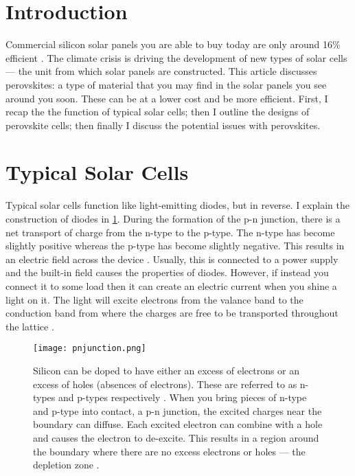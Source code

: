 \documentclass{physics_article_B}
\date{\today}
\begin{document}
\maketitle

\section*{Introduction}
Commercial silicon solar panels you are able to buy today are only around 16\% efficient \cite{extance_reality_2019}. The climate crisis is driving the development of new types of solar cells --- the unit from which solar panels are constructed. This article discusses perovskites: a type of material that you may find in the solar panels you see around you soon. These can be at a lower cost and be more efficient. First, I recap the the function of typical solar cells; then I outline the designs of perovskite cells; then finally I discuss the potential issues with perovskites.

\section*{Typical Solar Cells}

Typical solar cells function like light-emitting diodes, but in reverse. I explain the construction of diodes in \cref{fig:pnjunction}. During the formation of the p-n junction, there is a net transport of charge from the n-type to the p-type. The n-type has become slightly positive whereas the p-type has become slightly negative. This results in an electric field across the device \cite{zhang_device_2017}. Usually, this is connected to a power supply and the built-in field causes the properties of diodes. However, if instead you connect it to some load then it can create an electric current when you shine a light on it. The light will excite electrons from the valance band to the conduction band from where the charges are free to be transported throughout the lattice \cite{zhang_device_2017}.

\begin{figure}[h]
 \centering
 \texttt{[image: pnjunction.png]}
 \caption{Silicon can be doped to have either an excess of electrons or an excess of holes (absences of electrons). These are referred to as n-types and p-types respectively \cite{zhang_device_2017}. When you bring pieces of n-type and p-type into contact, a p-n junction, the excited charges near the boundary can diffuse. Each excited electron can combine with a hole and causes the electron to de-excite. This results in a region around the boundary where there are no excess electrons or holes --- the depletion zone \cite{zhang_device_2017}.}
 \label{fig:pnjunction}
\end{figure}
\end{document}
